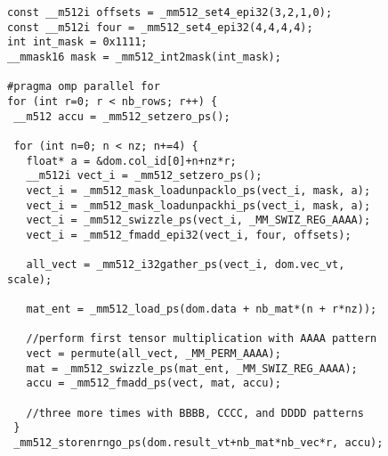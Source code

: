 \documentclass{article}
\begin{document}
\thispagestyle{empty}

\begin{figure}[h]
\begin{center}
\begin{verbatim}
const __m512i offsets = _mm512_set4_epi32(3,2,1,0);
const __m512i four = _mm512_set4_epi32(4,4,4,4); 
int int_mask = 0x1111;
__mmask16 mask = _mm512_int2mask(int_mask);

#pragma omp parallel for
for (int r=0; r < nb_rows; r++) {
 __m512 accu = _mm512_setzero_ps();

 for (int n=0; n < nz; n+=4) {
   float* a = &dom.col_id[0]+n+nz*r;
   __m512i vect_i = _mm512_setzero_ps();
   vect_i = _mm512_mask_loadunpacklo_ps(vect_i, mask, a);
   vect_i = _mm512_mask_loadunpackhi_ps(vect_i, mask, a);
   vect_i = _mm512_swizzle_ps(vect_i, _MM_SWIZ_REG_AAAA);
   vect_i = _mm512_fmadd_epi32(vect_i, four, offsets);

   all_vect = _mm512_i32gather_ps(vect_i, dom.vec_vt, scale);

   mat_ent = _mm512_load_ps(dom.data + nb_mat*(n + r*nz));

   //perform first tensor multiplication with AAAA pattern
   vect = permute(all_vect, _MM_PERM_AAAA);
   mat = _mm512_swizzle_ps(mat_ent, _MM_SWIZ_REG_AAAA);
   accu = _mm512_fmadd_ps(vect, mat, accu);

   //three more times with BBBB, CCCC, and DDDD patterns
 }
 _mm512_storenrngo_ps(dom.result_vt+nb_mat*nb_vec*r, accu);  
\end{verbatim}
\end{center}
\end{figure}
\end{document}
